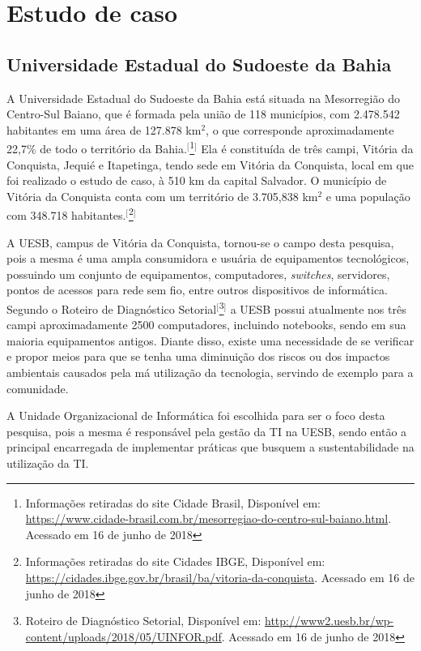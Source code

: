 
\chapter{Estudo de caso}\label{chap:estudodecaso}

\section{Universidade Estadual do Sudoeste da Bahia}

A Universidade Estadual do Sudoeste da Bahia está situada na Mesorregião do Centro-Sul Baiano, que é formada pela união de 118 municípios, com 2.478.542 habitantes em uma área de 127.878 km$^{2}$, o que corresponde aproximadamente 22,7\% de todo o território da Bahia.$^{[}$\footnote{Informações retiradas do site Cidade Brasil, Disponível em: \url{https://www.cidade-brasil.com.br/mesorregiao-do-centro-sul-baiano.html}. Acessado em 16 de junho de 2018}$^{]}$ Ela é constituída de três campi, Vitória da Conquista, Jequié e Itapetinga, tendo sede em Vitória da Conquista, local em que foi realizado o estudo de caso, à 510 km da capital Salvador. O município de Vitória da Conquista conta com um território de 3.705,838 km$^{2}$ e uma população com 348.718 habitantes.$^{[}$\footnote{Informações retiradas do site Cidades IBGE, Disponível em: \url{https://cidades.ibge.gov.br/brasil/ba/vitoria-da-conquista}.  Acessado em 16 de junho de 2018}$^{]}$

A UESB, campus de Vitória da Conquista, tornou-se o campo desta pesquisa, pois a mesma é uma ampla consumidora e usuária de equipamentos tecnológicos, possuindo um conjunto de equipamentos, computadores, \textit{switches}, servidores, pontos de acessos para rede sem fio, entre outros dispositivos de informática. Segundo o Roteiro de Diagnóstico Setorial$^{[}$\footnote{Roteiro de Diagnóstico Setorial, Disponível em: \url{http://www2.uesb.br/wp-content/uploads/2018/05/UINFOR.pdf}.  Acessado em 16 de junho de 2018}$^{]}$ a UESB possui atualmente nos três campi aproximadamente 2500 computadores, incluindo notebooks, sendo em sua maioria equipamentos antigos. Diante disso, existe uma necessidade de se verificar e propor meios para que se tenha uma diminuição dos riscos ou dos impactos ambientais causados pela má utilização da tecnologia, servindo de exemplo para a comunidade.

A Unidade Organizacional de Informática foi escolhida para ser o foco desta pesquisa, pois a mesma é responsável pela gestão da TI na UESB, sendo então a principal encarregada de implementar práticas que busquem a sustentabilidade na utilização da TI. 

